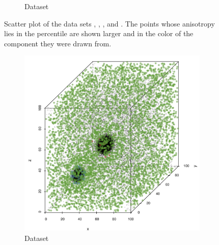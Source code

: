 \begin{figure}
\begin{subfigure}{0.23\textwidth}
			\caption{Dataset \baakmanFive}
			\label{fig:discussion:anisotropy:baakman5}
		\end{subfigure}			
		\caption{Scatter plot of the data sets
			 \ferdosiOne, %
			 \baakmanOne, %
			 \baakmanFour, and %
			 \baakmanFive. %
			The points whose anisotropy lies in the  percentile are shown larger and in the color of the component they were drawn from.}
		\label{fig:discussion:anisotropy:singleSphere}
	\end{figure}

	\begin{figure}
		\centering
		\begin{subfigure}{0.23\textwidth}
			\centering
			\includegraphics[keepaspectratio=true, width=\textwidth, height=0.23\textheight]{discussion/img/ferdosi_2_60000_anisotropy.png}
			\caption{Dataset \ferdosiTwo}
			\label{fig:discussion:anisotropy:ferdosi2}
		\end{subfigure}
		\begin{subfigure}{0.23\textwidth}
			\centering

\end{subfigure}
\end{figure}
